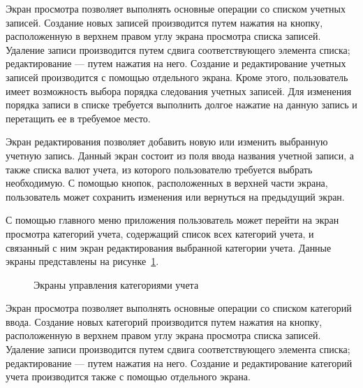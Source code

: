 Экран просмотра позволяет выполнять основные операции
со списком учетных записей.
Создание новых записей производится путем нажатия на кнопку,
расположенную в верхнем правом углу экрана просмотра списка записей.
Удаление записи производится путем сдвига соответствующего элемента списка;
редактирование --- путем нажатия на него.
Создание и редактирование учетных записей производится с помощью
отдельного экрана.
Кроме этого, пользователь имеет возможность выбора порядка следования
учетных записей. Для изменения порядка записи в списке требуется
выполнить долгое нажатие на данную запись и перетащить ее в требуемое место.

Экран редактирования позволяет добавить новую или изменить выбранную
учетную запись. Данный экран состоит из поля ввода названия учетной записи,
а также списка валют учета, из которого пользователю требуется выбрать необходимую.
С помощью кнопок, расположенных в верхней части экрана, пользователь
может сохранить изменения или вернуться на предыдущий экран.

С помощью главного меню приложения пользователь может перейти на
экран просмотра категорий учета, содержащий список всех категорий учета,
и связанный с ним экран редактирования выбранной категории учета.
Данные экраны представлены на рисунке~\ref{fig:implementation_ui_activity_category}.

\begin{figure}[h!]
  \centering
  \caption{Экраны управления категориями учета}
  \label{fig:implementation_ui_activity_category}
\end{figure}


Экран просмотра позволяет выполнять основные операции
со списком категорий ввода.
Создание новых категорий производится путем нажатия на кнопку,
расположенную в верхнем правом углу экрана просмотра списка записей.
Удаление записи производится путем сдвига соответствующего элемента списка;
редактирование --- путем нажатия на него.
Создание и редактирование категорий учета производится также
с помощью отдельного экрана.

